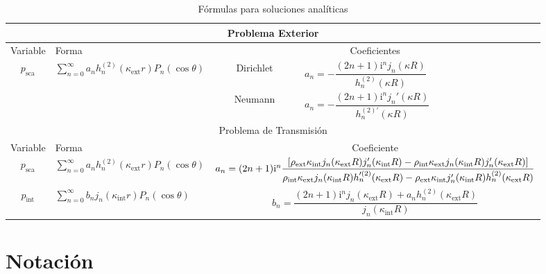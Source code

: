 \documentclass[11pt]{article}
\numberwithin{equation}{section}
\let\i\relax
\def\i{\mathrm{i}}
\def\exterior{\textrm{ext}}
\def\interior{\textrm{int}}
\def\sca{\textrm{sca}}
\begin{document}
\begin{table}[H]
\centering
\begin{tabular}{ |c|p{4cm}|c|p{4cm}|  }
	\hline
	\multicolumn{4}{|c|}{Problema Exterior} \\
	\hline
	Variable & Forma & \multicolumn{2}{|c|}{Coeficientes} \\
	\hline
	\multirow{2}{2cm}{ \(p_{\sca}\) }
	& 
	\multirow{2}{2cm}{ \(\sum_{n=0}^{\infty} a_n h^{(2)}_{n}(\kappa_{\exterior} r) P_{n}(\cos\theta)\) }
	&
	Dirichlet& \(a_n = -\dfrac{(2n+1)\i^n j_n(\kappa R)}{h_n^{(2)}(\kappa R)}\) \\[1em]
	\cline{3-4}
	&&
	Neumann& \( a_n = -\dfrac{(2n+1) \i^n j_n'(\kappa R)}{h_{n}^{(2)'}(\kappa R)}\)
	\\[1em]
	\hline
	\multicolumn{4}{|c|}{Problema de Transmisión} \\
	\hline
	Variable & Forma & \multicolumn{2}{|c|}{Coeficiente} \\
	\hline
	\(p_{\sca}\)
	& 
	\(\sum_{n=0}^{\infty} a_n h^{(2)}_{n}(\kappa_{\exterior} r) P_{n}(\cos\theta)\)
	&
	\multicolumn{2}{|c|}{\(
	a_{n} =
	(2n+1) \i^n
	\dfrac
	{%
		\left[
			\rho_{\exterior} \kappa_{\interior}
			j_n(\kappa_{\exterior} R)
			j'_{n}(\kappa_{\interior} R)
			-
			\rho_{\interior} \kappa_{\exterior}
			j_{n}(\kappa_{\interior} R)
			j'_{n}(\kappa_{\exterior} R)
		\right]
	}
	{%
		\rho_{\interior} \kappa_{\exterior}
		j_{n}(\kappa_{\interior} R)
		h'^{(2)}_{n}(\kappa_{\exterior} R)
		-
		\rho_{\exterior} \kappa_{\interior}
		j'_{n}(\kappa_{\interior} R)
		h^{(2)}_{n}(\kappa_{\exterior} R)
	}\)
	} \\[1em]
	\hline
	\(p_{\interior}\)
	&
	\( \sum_{n=0}^{\infty} b_n j_{n}(\kappa_{\interior} r) P_{n}(\cos\theta) \)
	&
	\multicolumn{2}{|c|}{\(
	b_n =
	\dfrac
	{
		(2n + 1) \i^n j_n(\kappa_{\exterior} R) 
		+ 
		a_{n} h^{(2)}_{n} (\kappa_{\exterior} R)
	}
	{
		j_{n}(\kappa_{\interior} R)
	}
	\)}\\[1em]
	\hline
\end{tabular}
\caption{Fórmulas para soluciones analíticas}
\end{table}

\appendix

\restoregeometry

\section{Notación}\label{ap:notacion}
\end{document}

